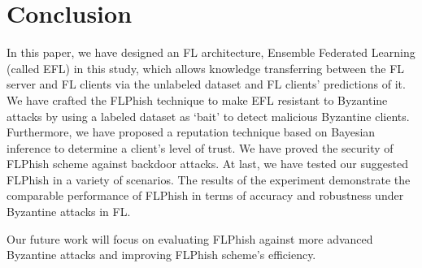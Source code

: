 \documentclass[lettersize,journal]{IEEEtran}
\begin{document}
\section{Conclusion}
In this paper, we have designed an FL architecture, Ensemble Federated Learning (called EFL) in this study, which allows knowledge transferring between the FL server and FL clients via the unlabeled dataset and FL clients' predictions of it. We have crafted the FLPhish technique to make EFL resistant to Byzantine attacks by using a labeled dataset as `bait' to detect malicious Byzantine clients. Furthermore, we have proposed a reputation technique based on Bayesian inference to determine a client's level of trust. We have proved the security of FLPhish scheme against backdoor attacks. At last, we have tested our suggested FLPhish in a variety of scenarios. The results of the experiment demonstrate the comparable performance of FLPhish in terms of accuracy and robustness under Byzantine attacks in FL. 
\par Our future work will focus on evaluating FLPhish against more advanced Byzantine attacks and improving FLPhish scheme's efficiency.






\end{document}
